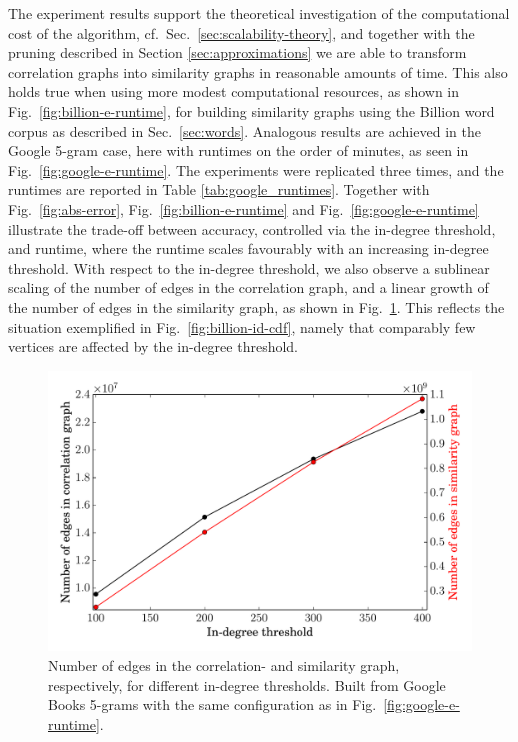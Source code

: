 \documentclass{kais}
\begin{document}
The experiment results support the theoretical investigation of the computational
cost of the algorithm, cf.~Sec.~\ref{sec:scalability-theory}, and together with the pruning
described in Section \ref{sec:approximations} we are able to transform correlation graphs into similarity
graphs in reasonable amounts of time. This also holds true when using more modest computational resources,
as shown in Fig.\ \ref{fig:billion-e-runtime}, for building similarity graphs using the Billion word corpus as described
in Sec.\ \ref{sec:words}. Analogous results are achieved in the Google 5-gram case, here with runtimes on the order of minutes,
as seen in Fig.\ \ref{fig:google-e-runtime}. The experiments were replicated three times, and
the runtimes are reported in Table \ref{tab:google_runtimes}.
Together with Fig.\ \ref{fig:abs-error}, Fig.\ \ref{fig:billion-e-runtime} and Fig.\ \ref{fig:google-e-runtime} illustrate the trade-off between accuracy, controlled
via the in-degree threshold, and runtime, where the runtime scales favourably with an increasing in-degree threshold.
With respect to the in-degree threshold, we also observe a sublinear scaling of the number of edges in the correlation
graph, and a linear growth of the number of  edges in the similarity graph,  as shown in Fig.\ \ref{fig:google-ne}. This reflects the situation exemplified in Fig.\ \ref{fig:billion-id-cdf}, namely that comparably few vertices are affected by the in-degree threshold.

\begin{figure}
\centerline{\includegraphics[width=0.75\columnwidth]{figures/eng-all-edge-low-e3-vtx-low-e8-high-e1-100-400-idg-ne-nt.pdf}}
\caption{Number of edges in the correlation- and similarity graph, respectively, for different in-degree thresholds. Built from Google Books 5-grams
with the same configuration as in Fig.\ \ref{fig:google-e-runtime}.}
\label{fig:google-ne}
\end{figure}
\end{document}
